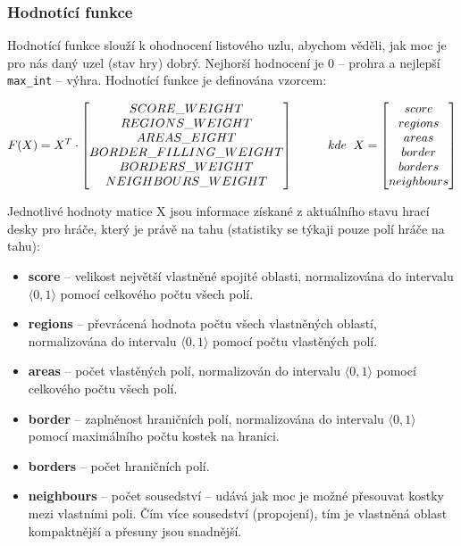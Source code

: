 \documentclass[12pt]{article}
\begin{document}
\subsubsection*{Hodnotící funkce}
\label{function}
Hodnotící funkce slouží k ohodnocení listového uzlu, abychom věděli, jak moc je pro nás daný uzel (stav hry) dobrý. Nejhorší hodnocení je 0 -- prohra a nejlepší \texttt{max\_int} -- výhra. Hodnotící funkce je definována vzorcem:

\[ F(X) = X^T \cdot \begin{bmatrix}
SCORE\_WEIGHT \\
REGIONS\_WEIGHT \\
AREAS\_EIGHT \\
BORDER\_FILLING\_WEIGHT \\
BORDERS\_WEIGHT \\
NEIGHBOURS\_WEIGHT
\end{bmatrix} \hspace{1cm} kde \hspace{0.2cm} X = \begin{bmatrix}
score \\
regions \\
areas \\
border \\
borders \\
neighbours
\end{bmatrix} \]

Jednotlivé hodnoty matice X jsou informace získané z aktuálního stavu hrací desky pro hráče, který je právě na tahu (statistiky se týkaji pouze polí hráče na tahu):
\begin{itemize}
    \item \textbf{score} -- velikost největší vlastněné spojité oblasti, normalizována do intervalu $\langle 0, 1 \rangle$ pomocí celkového počtu všech polí.
    \item \textbf{regions} -- převrácená hodnota počtu všech vlastněných oblastí, normalizována do intervalu $\langle 0, 1 \rangle$ pomocí počtu vlastěných polí.
    \item \textbf{areas} -- počet vlastěných polí, normalizován do intervalu $\langle 0, 1 \rangle$ pomocí celkového počtu všech polí.
    \item \textbf{border} -- zaplněnost hraničních polí, normalizována do intervalu $\langle 0, 1 \rangle$ pomocí maximálního počtu kostek na hranici.
    \item \textbf{borders} -- počet hraničních polí.
    \item \textbf{neighbours} -- počet sousedství -- udává jak moc je možné přesouvat kostky mezi vlastními poli. Čím více sousedství (propojení), tím je vlastněná oblast kompaktnější a přesuny jsou snadnější.
\end{itemize}
\end{document}
